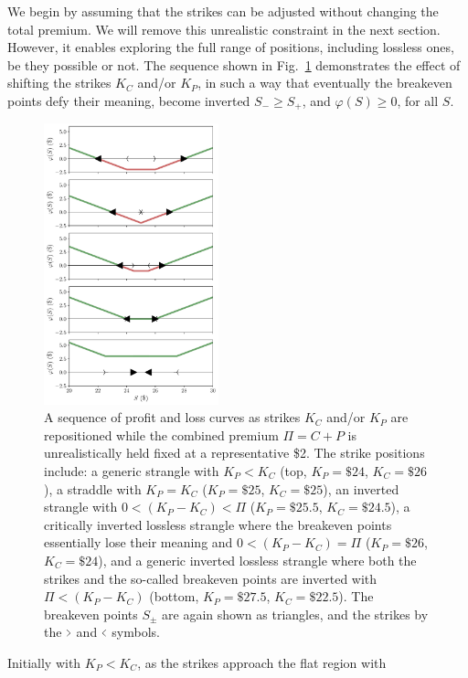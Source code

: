 \documentclass[aps,reprint]{revtex4-2}
\begin{document}
We begin by assuming that the strikes can be adjusted without changing the total premium.
We will remove this unrealistic constraint in the next section. However, it enables 
exploring the full range of positions, including lossless ones, be they possible or not.
The sequence shown in Fig.~\ref{fig:sequence} demonstrates the effect of shifting the strikes $K_C$ and/or $K_P$,  in such a way that eventually the breakeven points defy their meaning, become inverted $S_- \ge S_+$, and $\varphi(S) \ge 0$, for all $S$.
\begin{figure}[htb]
    \centering
    \includegraphics[width=0.45\textwidth]{figs/strangle_sequence.pdf}
\caption{
    A sequence of profit and loss curves as strikes $K_C$ and/or $K_P$ are repositioned while the combined premium $\Pi = C+P$ is unrealistically held fixed at a representative \$2. The strike positions include:
    a generic strangle with $K_P < K_C$ (top, $K_P=\$24$, $K_C=\$26$),
    a straddle with $K_P = K_C$ ($K_P=\$25$, $K_C=\$25$),
    an inverted strangle with $0 < (K_P - K_C) < \Pi$ ($K_P=\$25.5$, $K_C=\$24.5$),
    a critically inverted lossless strangle where the breakeven points essentially lose their meaning and $0 < (K_P - K_C) = \Pi$ ($K_P=\$26$, $K_C=\$24$),
    and a generic inverted lossless strangle where both the strikes and the so-called breakeven points are inverted with $\Pi < (K_P - K_C)$ (bottom, $K_P=\$27.5$, $K_C=\$22.5$). 
    The breakeven points $S_\pm$ are again shown as triangles, and the strikes by the $ \scalebox{0.5}[1]{$>$} $ and $\scalebox{0.5}[1]{$<$}$ symbols.
}
    \label{fig:sequence}
\end{figure}
Initially with $K_P < K_C$, as the strikes approach the flat region with 
\end{document}
